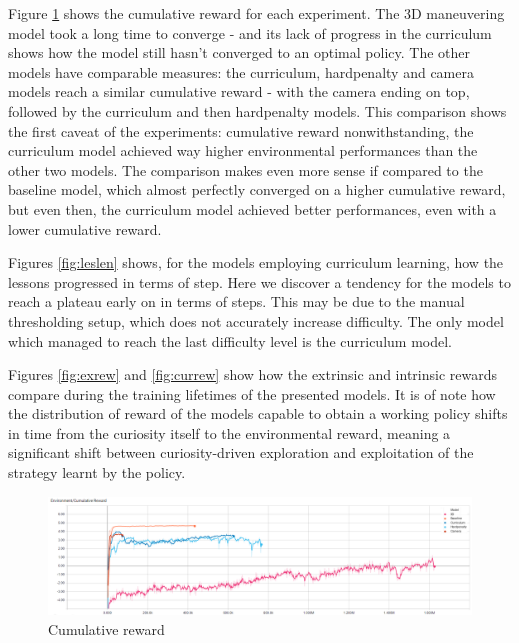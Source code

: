 \documentclass{ifacconf}
\begin{document}
Figure \ref{fig:cumrew} shows the cumulative reward for each experiment. The 3D maneuvering model took a long time to converge - and its lack of progress in the curriculum shows how the model still hasn't converged to an optimal policy. The other models have comparable measures: the curriculum, hardpenalty and camera models reach a similar cumulative reward - with the camera ending on top, followed by the curriculum and then hardpenalty models. This comparison shows the first caveat of the experiments: cumulative reward nonwithstanding, the curriculum model achieved way higher environmental performances than the other two models. The comparison makes even more sense if compared to the baseline model, which almost perfectly converged on a higher cumulative reward, but even then, the curriculum model achieved better performances, even with a lower cumulative reward.

Figures \ref{fig:leslen} shows, for the models employing curriculum learning, how the lessons progressed in terms of step. Here we discover a tendency for the models to reach a plateau early on in terms of steps. This may be due to the manual thresholding setup, which does not accurately increase difficulty. The only model which managed to reach the last difficulty level is the curriculum model. 

Figures \ref{fig:exrew} and \ref{fig:currew} show how the extrinsic and intrinsic rewards compare during the training lifetimes of the presented models. It is of note how the distribution of reward of the models capable to obtain a working policy shifts in time from the curiosity itself to the environmental reward, meaning a significant shift between curiosity-driven exploration and exploitation of the strategy learnt by the policy.


\begin{figure}[!htb]
\begin{center}
\includegraphics[width=\linewidth]{res/cumulative_reward.PNG} 
\caption{Cumulative reward} 
\label{fig:cumrew}
\end{center}
\end{figure}
\end{document}

